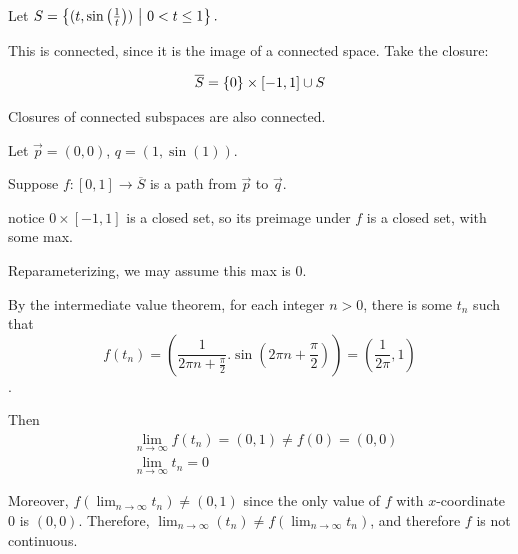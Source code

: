 \documentclass[12pt, twosided]{article}
\begin{document}
\begin{exa}\hspace{1em}

  \begin{center}
  \end{center}
  Let \(S = \left\{ (t, \sin\left(\frac{1}{t}\right)) \ \middle\vert\  0 < t \leq 1 \right\}.\)

  This is connected, since it is the image of a connected space. Take the closure:

  \begin{align*}
    \overline{S} = \left\{ 0 \right\} \times [-1, 1] \cup S
  \end{align*}
\end{exa}

\begin{fact}
  Closures of connected subspaces are also connected.
\end{fact}

Let \(\vec{p} = (0, 0)\), \(q = (1, \sin(1))\).

Suppose \(f: [0,1] \to \overline{S}\) is a path from \(\vec{p}\) to \(\vec{q}\).

notice \(0 \times [-1, 1]\) is a closed set, so its preimage under \(f\) is a closed set, with some max.

Reparameterizing, we may assume this max is \(0\).

By the intermediate value theorem, for each integer \(n > 0\), there is some \(t_n\) such that \[f(t_n) = \left(\frac{1}{2\pi n + \frac{\pi}{2}}. \sin\left(2\pi n + \frac{\pi}{2}\right)\right) = \left(\frac{1}{2\pi}, 1\right) \].

Then
\begin{align*}
  &\lim_{n \to \infty} f(t_n) = (0, 1) \neq f(0) = (0, 0) \\
  &\lim_{n \to \infty} t_n = 0
\end{align*}

Moreover, \(f\left(\lim_{n \to \infty} t_n\right) \neq (0,1)\) since the only value of \(f\) with \(x\)-coordinate \(0\) is \((0,0)\). Therefore, \(\lim_{n \to \infty}(t_n) \neq f(\lim_{n \to \infty} t_n)\), and therefore \(f\) is not continuous.
\end{document}
